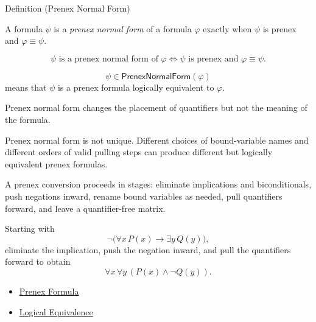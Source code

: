 \begin{definitionbox}{Definition (Prenex Normal Form)}
\begin{definition}
\label{def:pnf}
A formula \(\psi\) is a \emph{prenex normal form} of a formula \(\varphi\)
exactly when \(\psi\) is prenex and \(\varphi\equiv\psi\).
\end{definition}
\end{definitionbox}

\begin{remark*}
\[
\psi \text{ is a prenex normal form of } \varphi
\Longleftrightarrow
\psi \text{ is prenex}
\text{ and }
\varphi\equiv\psi.
\]
\end{remark*}

\begin{remark*}
\[
  \psi\in\mathsf{PrenexNormalForm}(\varphi)
\] means that \(\psi\) is a
prenex formula logically equivalent to \(\varphi\).
\end{remark*}

\begin{remark*}[Interpretation]
Prenex normal form changes the placement of quantifiers but not the meaning of
the formula.
\end{remark*}

\begin{remark*}[Exposition]
Prenex normal form is not unique. Different choices of bound-variable names and
different orders of valid pulling steps can produce different but logically
equivalent prenex formulas.
\end{remark*}

\begin{remark*}[Exposition]
A prenex conversion proceeds in stages: eliminate implications and
biconditionals, push negations inward, rename bound variables as needed, pull
quantifiers forward, and leave a quantifier-free matrix.
\end{remark*}

\begin{remark*}[Examples]
Starting with
\[
\neg\bigl(\forall x\,P(x)\to\exists y\,Q(y)\bigr),
\]
eliminate the implication, push the negation inward, and pull the quantifiers
forward to obtain
\[
\forall x\,\forall y\,(P(x)\land\neg Q(y)).
\]
\end{remark*}

\begin{dependencies}
\begin{itemize}
  \item \hyperref[def:prenex-formula]{Prenex Formula}
  \item \hyperref[def:log-equiv]{Logical Equivalence}
\end{itemize}
\end{dependencies}

